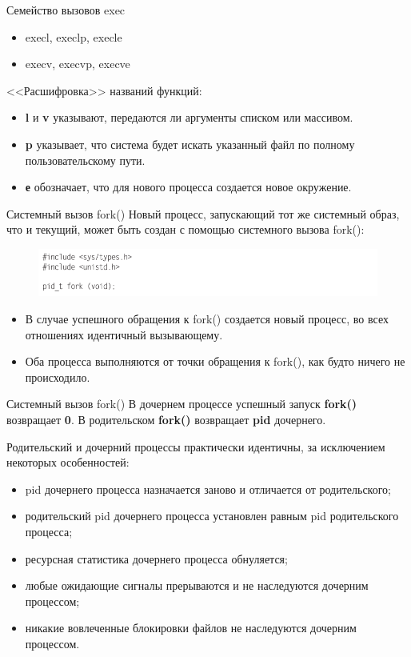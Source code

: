 \documentclass{beamer}
\begin{document}
\begin{frame}{Семейство вызовов exec}
\begin{itemize}
\item execl, execlp, execle  
\item execv, execvp, execve
\end{itemize}
<<Расшифровка>> названий функций:
\begin{itemize}
\item \textbf{l} и \textbf{v} указывают, передаются ли аргументы списком или массивом. 
\item \textbf{p} указывает, что система будет искать указанный файл по
полному пользовательскому пути. 
\item \textbf{е} обозначает, что для нового процесса создается новое окружение.
\end{itemize}
\end{frame}

\begin{frame}{Системный вызов fork()}
Новый процесс, запускающий тот же системный образ, что и текущий, может быть
создан с помощью системного вызова fork():
\begin{figure}[h]
\centering
\includegraphics[scale=0.5]{images/lec07-pic07.png}
\end{figure}
\begin{itemize}
\item В случае успешного обращения к fork() создается новый процесс, во всех отношениях идентичный вызывающему. 
\item Оба процесса выполняются от точки обращения к fork(), как будто ничего не происходило.
\end{itemize}
\end{frame}

\begin{frame}{Системный вызов fork()}
В дочернем процессе успешный запуск \textbf{fork()} возвращает \textbf{0}. В родительском \textbf{fork()} возвращает \textbf{pid} дочернего. 

Родительский и дочерний процессы практически идентичны, за исключением некоторых особенностей:
\begin{itemize}
\item pid дочернего процесса назначается заново и отличается от родительского;
\item родительский pid дочернего процесса установлен равным pid родительского
процесса;
\item ресурсная статистика дочернего процесса обнуляется;
\item любые ожидающие сигналы прерываются и не наследуются дочерним процессом;
\item никакие вовлеченные блокировки файлов не наследуются дочерним процессом.
\end{itemize}
\end{frame}
\end{document}
